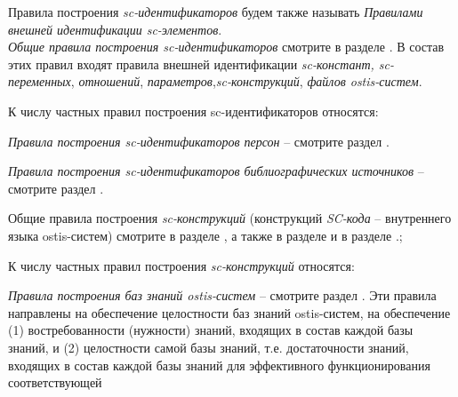 \begin{SCn}
{\begin{scnvector}
{\begin{scnitemize}
\begin{scnindent}
								\end{scnindent}
			            \end{scnitemize}}
			\item{Правила построения \textit{sc-идентификаторов} будем также
			            называть \textit{Правилами внешней идентификации sc-элементов}.\\
			            \textit{Общие правила построения sc-идентификаторов} смотрите в
			            разделе . В состав этих правил входят правила внешней
			            идентификации \textit{sc-констант, sc-переменных}, \textit{отношений},
				            \textit{параметров},\textit{sc-конструкций}, \textit{файлов ostis-систем}.}
			\item{К числу частных правил построения sc-идентификаторов
			            относятся:
			            \begin{scnitemize}
				            \item\textit{Правила построения sc-идентификаторов
					            персон} -- смотрите раздел .
				            \item\textit{Правила построения sc-идентификаторов
					            библиографических источников} -- смотрите раздел .
			            \end{scnitemize}}
			\item{Общие правила построения \textit{sc-конструкций}
			            (конструкций \textit{SC-кода} -- внутреннего языка ostis-систем) смотрите в
			            разделе , а также в разделе
			             и в разделе \scnqqi{\nameref{sd_sc_code_semantic}}.};
			\item{К числу частных правил построения \textit{sc-конструкций}
			            относятся:
			            \begin{scnitemize}
				            \item \textit{Правила построения баз знаний
					            ostis-систем} -- смотрите раздел . Эти правила направлены
				            на обеспечение целостности баз знаний ostis-систем, на обеспечение (1)
				            востребованности (нужности) знаний, входящих в состав каждой базы знаний, и (2)
				            целостности самой базы знаний, т.е. достаточности знаний, входящих в состав
				            каждой базы знаний для эффективного функционирования соответствующей

\end{scnitemize}}
\end{scnvector}}
\end{SCn}
